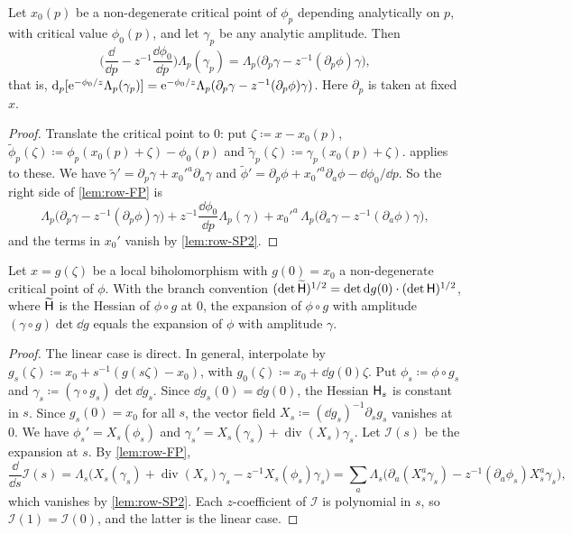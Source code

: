 \begin{lem}
\label{lem:row-SP3}
Let $x_0(p)$ be a non-degenerate critical point of $\phi_p$ depending analytically on $p$, with critical value $\phi_0(p)$, and let $\gamma_p$ be any analytic amplitude. Then
\[
\Big(\frac{\dd}{\dd p}-z^{-1}\frac{\dd\phi_0}{\dd p}\Big)\Lambda_p(\gamma_p)=\Lambda_p\big(\partial_p\gamma-z^{-1}(\partial_p\phi)\gamma\big),
\]
that is, $\mathrm{d}_p[\mathrm{e}^{-\phi_0/z}\Lambda_p(\gamma_p)]=\mathrm{e}^{-\phi_0/z}\Lambda_p(\partial_p\gamma-z^{-1}(\partial_p\phi)\gamma)$. Here $\partial_p$ is taken at fixed $x$.
\end{lem}

\begin{proof}
Translate the critical point to $0$: put $\zeta\coloneqq x-x_0(p)$, $\widetilde\phi_p(\zeta)\coloneqq\phi_p(x_0(p)+\zeta)-\phi_0(p)$ and $\widetilde\gamma_p(\zeta)\coloneqq\gamma_p(x_0(p)+\zeta)$.  applies to these. We have $\widetilde\gamma'=\partial_p\gamma+x_0'^a\partial_a\gamma$ and $\widetilde\phi'=\partial_p\phi+x_0'^a\partial_a\phi-\dd\phi_0/\dd p$. So the right side of \cref{lem:row-FP} is
\[
\Lambda_p\big(\partial_p\gamma-z^{-1}(\partial_p\phi)\gamma\big)+z^{-1}\frac{\dd\phi_0}{\dd p}\Lambda_p(\gamma)+x_0'^a\,\Lambda_p\big(\partial_a\gamma-z^{-1}(\partial_a\phi)\gamma\big),
\]
and the terms in $x_0'$ vanish by \cref{lem:row-SP2}.
\end{proof}


\begin{lem}
\label{lem:row-SP1}
Let $x=g(\zeta)$ be a local biholomorphism with $g(0)=x_0$ a non-degenerate critical point of $\phi$. With the branch convention $(\det\widetilde{\mathsf{H}})^{1/2}=\det\mathrm{d} g(0)\cdot(\det\mathsf{H})^{1/2}$, where $\widetilde{\mathsf{H}}$ is the Hessian of $\phi\circ g$ at $0$, the expansion of $\phi\circ g$ with amplitude $(\gamma\circ g)\det\dd g$ equals the expansion of $\phi$ with amplitude $\gamma$.
\end{lem}

\begin{proof}
The linear case is direct. In general, interpolate by $g_s(\zeta)\coloneqq x_0+s^{-1}(g(s\zeta)-x_0)$, with $g_0(\zeta)\coloneqq x_0+\dd g(0)\zeta$. Put $\phi_s\coloneqq\phi\circ g_s$ and $\gamma_s\coloneqq(\gamma\circ g_s)\det\dd g_s$. Since $\dd g_s(0)=\dd g(0)$, the Hessian $\mathsf{H}_s$ is constant in $s$. Since $g_s(0)=x_0$ for all $s$, the vector field $X_s\coloneqq(\dd g_s)^{-1}\partial_sg_s$ vanishes at $0$. We have $\phi_s'=X_s(\phi_s)$ and $\gamma_s'=X_s(\gamma_s)+\operatorname{div}(X_s)\gamma_s$. Let $\mathcal{I}(s)$ be the expansion at $s$. By \cref{lem:row-FP},
\[
\frac{\dd}{\dd s}\mathcal{I}(s)=\Lambda_s\big(X_s(\gamma_s)+\operatorname{div}(X_s)\gamma_s-z^{-1}X_s(\phi_s)\gamma_s\big)=\sum_a\Lambda_s\big(\partial_a(X_s^a\gamma_s)-z^{-1}(\partial_a\phi_s)X_s^a\gamma_s\big),
\]
which vanishes by \cref{lem:row-SP2}. Each $z$-coefficient of $\mathcal{I}$ is polynomial in $s$, so $\mathcal{I}(1)=\mathcal{I}(0)$, and the latter is the linear case.
\end{proof}

